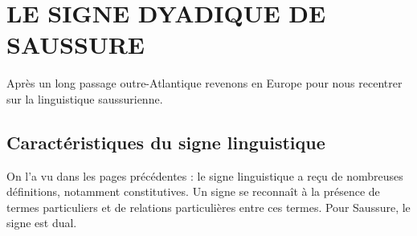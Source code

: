 \section{LE SIGNE DYADIQUE DE SAUSSURE}
Après un long passage outre-Atlantique revenons en Europe pour nous recentrer sur la linguistique saussurienne.

\subsection{Caractéristiques du signe linguistique}
On l’a vu dans les pages précédentes : le signe linguistique a reçu de nombreuses définitions, notamment constitutives. Un signe se reconnaît à la présence de termes particuliers et de relations particulières entre ces termes. Pour Saussure, le signe est dual.

